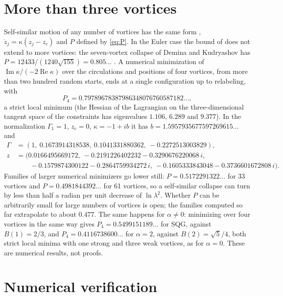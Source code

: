\documentclass[11pt]{article}
\theoremstyle{definition}
\newcommand{\re}{\operatorname{Re}}
\newcommand{\im}{\operatorname{Im}}
\begin{document}
\section{More than three vortices}\label{sec:more}

Self-similar motion of any number of vortices has the same form \cite{dk2014,gotoda2021,oneil2007}, $\dot z_j = \kappa(z_j - z_c)$ and $P$ defined by \eqref{eq:P}. In the Euler case the bound of \cite{hendrick2026} does not extend to more vortices: the seven-vortex collapse of Demina and Kudryashov \cite[Table~1]{dk2014} has $P = 12433/(1240\sqrt{155}) = 0.805\ldots$ \cite{hendrick2026}. A numerical minimization of $\im\kappa/(-2\re\kappa)$ over the circulations and positions of four vortices, from more than two hundred random starts, ends at a single configuration up to relabeling, with
\[
P_4 = 0.79789678387986348076760587182\ldots,
\]
a strict local minimum (the Hessian of the Lagrangian on the three-dimensional tangent space of the constraints has eigenvalues $1.106$, $6.289$ and $9.377$). In the normalization $\Gamma_1 = 1$, $z_c = 0$, $\kappa = -1 + ib$ it has $b = 1.5957935677597269615\ldots$ and
\begin{align*}
\Gamma &= (1,\ 0.1673914318538,\ 0.1041331880362,\ -0.2272513003829),\\
z &= (0.0166495669172,\ -0.2191226402232 - 0.3290676220068\,i,\\
&\qquad -0.1579874300122 - 0.2864759934272\,i,\ -0.1605333843048 - 0.3736601672808\,i).
\end{align*}
Families of larger numerical minimizers go lower still: $P = 0.5172291322\ldots$ for 33 vortices and $P = 0.4981844392\ldots$ for 61 vortices, so a self-similar collapse can turn by less than half a radian per unit decrease of $\ln\lambda^2$. Whether $P$ can be arbitrarily small for large numbers of vortices is open; the families computed so far extrapolate to about $0.477$. The same happens for $\alpha \ne 0$: minimizing over four vortices in the same way gives $P_4 = 0.5499151189\ldots$ for SQG, against $B(1) = 2/3$, and $P_4 = 0.4116738600\ldots$ for $\alpha = 2$, against $B(2) = \sqrt5/4$, both strict local minima with one strong and three weak vortices, as for $\alpha = 0$. These are numerical results, not proofs.

\section{Numerical verification}\label{sec:numerics}
\end{document}
